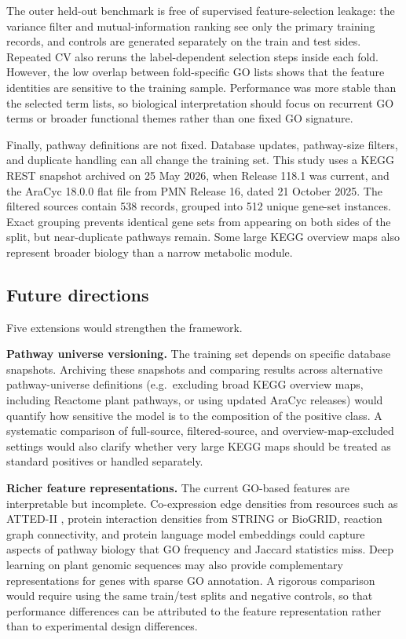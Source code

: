 \documentclass[12pt,twoside]{article}
\begin{document}
The outer held-out benchmark is free of supervised feature-selection leakage: the variance filter and mutual-information ranking see only the primary training records, and controls are generated separately on the train and test sides. Repeated CV also reruns the label-dependent selection steps inside each fold. However, the low overlap between fold-specific GO lists shows that the feature identities are sensitive to the training sample. Performance was more stable than the selected term lists, so biological interpretation should focus on recurrent GO terms or broader functional themes rather than one fixed GO signature.

Finally, pathway definitions are not fixed. Database updates, pathway-size filters, and duplicate handling can all change the training set. This study uses a KEGG REST snapshot archived on 25 May 2026, when Release 118.1 was current, and the AraCyc 18.0.0 flat file from PMN Release 16, dated 21 October 2025. The filtered sources contain 538 records, grouped into 512 unique gene-set instances. Exact grouping prevents identical gene sets from appearing on both sides of the split, but near-duplicate pathways remain. Some large KEGG overview maps also represent broader biology than a narrow metabolic module.

\subsection{Future directions}
\label{sec:disc_future_work}

Five extensions would strengthen the framework.

\textbf{Pathway universe versioning.} The training set depends on specific database snapshots. Archiving these snapshots and comparing results across alternative pathway-universe definitions (e.g.\ excluding broad KEGG overview maps, including Reactome plant pathways, or using updated AraCyc releases) would quantify how sensitive the model is to the composition of the positive class. A systematic comparison of full-source, filtered-source, and overview-map-excluded settings would also clarify whether very large KEGG maps should be treated as standard positives or handled separately.

\textbf{Richer feature representations.} The current GO-based features are interpretable but incomplete. Co-expression edge densities from resources such as ATTED-II \citep{obayashi2018atted}, protein interaction densities from STRING or BioGRID, reaction graph connectivity, and protein language model embeddings \citep{lin2023evolutionary} could capture aspects of pathway biology that GO frequency and Jaccard statistics miss. Deep learning on plant genomic sequences may also provide complementary representations for genes with sparse GO annotation. A rigorous comparison would require using the same train/test splits and negative controls, so that performance differences can be attributed to the feature representation rather than to experimental design differences.
\end{document}
